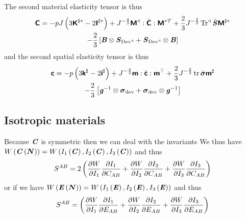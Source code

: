 The second material elasticity tensor is thus
\begin{multline}
  \tensorfour{C}=-pJ\pbrac{3\tensorfour{K}^{\sharp *}-2\tensorfour{I}^{\sharp
      *}}
  +J^{-\frac{4}{3}}\doubledotprodthree{\pullback{\tensorfour{M}}{}}{\bar{\tensorfour{C}}}{\tensorfour{M}^{*T}}+\dfrac{2}{3}J^{-\frac{2}{3}}\pullback{\Trop}{}\bar{\tensortwo{S}}\tensorfour{M}^{\sharp
    *}\\
  -\dfrac{2}{3}\sqbrac{\tensorprod{\tensortwo{B}}{\tensor{S}_{\pullback{\Devop}{}}}+\tensorprod{\tensortwo{S}_{\pullback{\Devop}{}}}{\tensortwo{B}}}
  \label{eqn:IncompressibleSecondMaterialElasticityTensor}
\end{multline}
and the second spatial elasticity tensor is thus
\begin{multline}
  \tensorfour{c}=-p\pbrac{3\tensorfour{k}^{\sharp}-2\tensorfour{i}^{\sharp}}
  +J^{-\frac{4}{3}}\doubledotprodthree{\tensorfour{m}}{\bar{\tensorfour{c}}}{\transpose{\tensorfour{m}}}+\dfrac{2}{3}J^{-\frac{2}{3}}\trop\bar{\tensortwo{\sigma}}\tensorfour{m}^{\sharp}\\
  -\dfrac{2}{3}\sqbrac{\tensorprod{\inverse{\tensortwo{g}}}{\tensor{\sigma}_{\devop}}+\tensorprod{\tensortwo{\sigma}_{\devop}}{\inverse{\tensortwo{g}}}}
  \label{eqn:IncompressibleSecondSpatialElasticityTensor}
\end{multline}

\subsection{Isotropic materials}

Because $\boldsymbol{\mathit{C}}$ is symmetric then we can deal with the invariants \ie
We thus have
$ W\left(  \boldsymbol{\mathit{C}}\left(  \boldsymbol{N}  \right)  \right) = W\left(  I_{1}\left( \boldsymbol{\mathit{C}} \right) , I_{2}\left( \boldsymbol{\mathit{C}} \right) , I_{3}\left( \boldsymbol{\mathit{C}} \right)  \right) $ and
thus
\begin{equation}
  S^{AB}=2\left(  \dfrac{\partial W}{\partial I_{1}}  \dfrac{\partial I_{1}}{\partial C_{AB}} + \dfrac{\partial W}{\partial I_{2}}  \dfrac{\partial I_{2}}{\partial C_{AB}} + \dfrac{\partial W}{\partial I_{3}}  \dfrac{\partial I_{3}}{\partial C_{AB}}  \right)
\end{equation}
or if we have
$ W\left(  \boldsymbol{\mathit{E}}\left(  \boldsymbol{N}  \right)  \right) = W\left(  I_{1}\left( \boldsymbol{\mathit{E}} \right) , I_{2}\left( \boldsymbol{\mathit{E}} \right) , I_{3}\left( \boldsymbol{\mathit{E}} \right)  \right) $ and
thus
\begin{equation}
  S^{AB}=\left(  \dfrac{\partial W}{\partial I_{1}}  \dfrac{\partial I_{1}}{\partial E_{AB}} + \dfrac{\partial W}{\partial I_{2}}  \dfrac{\partial I_{2}}{\partial E_{AB}} + \dfrac{\partial W}{\partial I_{3}}  \dfrac{\partial I_{3}}{\partial E_{AB}}  \right)
\end{equation}

